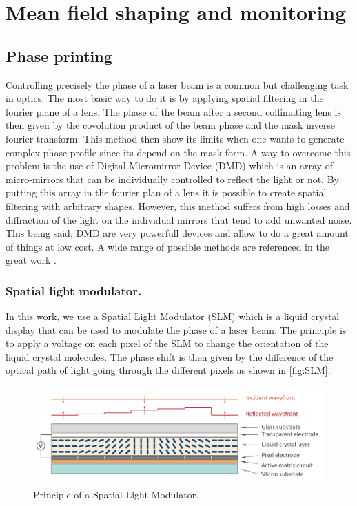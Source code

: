 \graphicspath{{./}{./fig/}{./appendices/fig0/}}

\chapter{Mean field shaping and monitoring}\label{chap:appendices}


\section{Phase printing}
\label{app:phase_printing}
Controlling precisely the phase of a laser beam is a common but challenging task in optics. The most basic way to do it is by applying spatial filtering in the fourier plane of a lens.
The phase of the beam after a second collimating lens is then given by the covolution product of the beam phase and the mask inverse fourier transform. This method then show its limits when one wants to 
generate complex phase profile since its depend on the mask form. A way to overcome this problem is the use of Digital Micromirror Device (DMD) which is an array of micro-mirrors that can be individually controlled to reflect the light or not.
By putting this array in the fourier plan of a lens it is possible to create spatial filtering with arbitrary shapes. However, this method suffers from high losses and diffraction of the light on the individual mirrors that tend to 
add unwanted noise. This being said, DMD are very powerfull devices and allow to do a great amount of things at low cost. A wide range of possible methods are referenced in the great work \cite{wavefront_shapping}. 

\bigskip

\subsection{Spatial light modulator.} In this work, we use a Spatial Light Modulator (SLM) which is a liquid crystal display that can be used to modulate the phase of a laser beam. The principle is to apply a voltage on each pixel of the SLM to change the orientation of the liquid crystal molecules. 
The phase shift is then given by the difference of the optical path of light going through the different pixels as shown in \autoref{fig:SLM}. 

\begin{figure}
    \centering
    \includegraphics[width=1\textwidth]{appendices/fig0/SLMprinciple.png}
    \caption{Principle of a Spatial Light Modulator.}
    \label{fig:SLM}
\end{figure}

